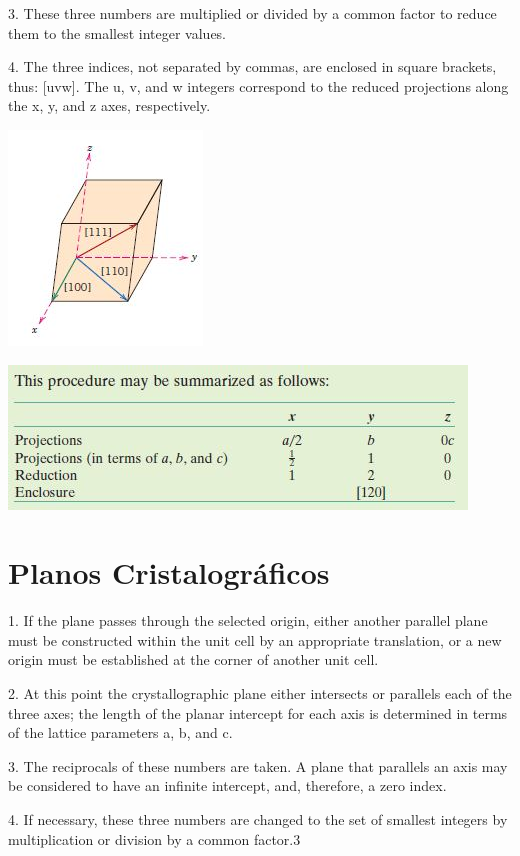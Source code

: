 3. These three numbers are multiplied or divided by a common factor to reduce
them to the smallest integer values.

4. The three indices, not separated by commas, are enclosed in square brackets,
thus: [uvw]. The u, v, and w integers correspond to the reduced projections
along the x, y, and z axes, respectively.

\includegraphics[scale=0.27,trim={0 0 0 0}]{figures/direcoesCrist}

\includegraphics[scale=0.27,trim={0 0 0 0}]{figures/direSum}


\section{Planos Cristalográficos}


1. If the plane passes through the selected origin, either another parallel plane
must be constructed within the unit cell by an appropriate translation, or a
new origin must be established at the corner of another unit cell.

2. At this point the crystallographic plane either intersects or parallels each of
the three axes; the length of the planar intercept for each axis is determined
in terms of the lattice parameters a, b, and c.

3. The reciprocals of these numbers are taken. A plane that parallels an axis
may be considered to have an infinite intercept, and, therefore, a zero index.

4. If necessary, these three numbers are changed to the set of smallest integers
by multiplication or division by a common factor.3

